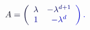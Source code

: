 \documentclass[12pt]{article}
\begin{document}
\makeatletter
\renewcommand*{\@textcolor}[3]{%
  \protect\leavevmode
  \begingroup
    \color#1{#2}#3%
  \endgroup
}
\makeatother
\begin{displaymath}
\mathcolor[RGB]{0,0,15}{A} \mathcolor[RGB]{0,0,30}{=} \mathcolor[RGB]{0,0,45}{\left(} \begin{array} {cc} { \mathcolor[RGB]{0,0,60}{\lambda} } & { \mathcolor[RGB]{0,0,75}{-} \mathcolor[RGB]{0,0,90}{\lambda} ^ { \mathcolor[RGB]{0,0,105}{d} \mathcolor[RGB]{0,0,120}{+} \mathcolor[RGB]{0,0,135}{1} } } \\ { \mathcolor[RGB]{0,0,150}{1} } & { \mathcolor[RGB]{0,0,165}{-} \mathcolor[RGB]{0,0,180}{\lambda} ^ { \mathcolor[RGB]{0,0,195}{d} } } \end{array} \mathcolor[RGB]{0,0,210}{\right)} \mathcolor[RGB]{0,0,225}{.}
\end{displaymath}
\end{document}
